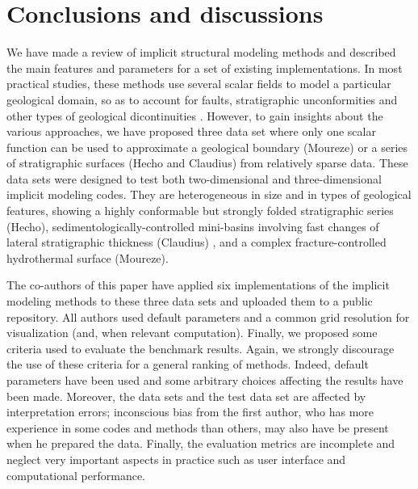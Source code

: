 \documentclass[final]{ring20}
\begin{document}
{%
 


\section*{Conclusions and discussions}
\label{sec:conclu}
We have made a review of implicit structural modeling methods and described the main features and parameters for a set of existing implementations. In most practical studies, these methods use several scalar fields to model a particular geological domain, so as to account for faults, stratigraphic unconformities and other types of geological dicontinuities \citep{Wellmann2018AiG}. However, to gain insights about the various approaches, we have proposed three data set where only one scalar function can be used to approximate a geological boundary (Moureze) or a series of stratigraphic surfaces (Hecho and Claudius) from relatively sparse data. 
These data sets were designed to test both two-dimensional and three-dimensional implicit modeling codes. They are heterogeneous in size and in types of geological features, showing a highly conformable but strongly folded stratigraphic series (Hecho), sedimentologically-controlled mini-basins involving fast changes of lateral stratigraphic thickness (Claudius) , and a complex fracture-controlled hydrothermal surface (Moureze). 

The co-authors of this paper have applied six implementations of the implicit modeling methods to these three data sets and uploaded them to a public repository. All authors used default parameters and a common grid resolution for visualization (and, when relevant computation). Finally, we proposed some criteria used to evaluate the benchmark results. Again, we strongly discourage the use of these criteria for a general ranking of methods. Indeed, default parameters have been used and some arbitrary choices affecting the results have been made. Moreover, the data sets and the test data set are affected by interpretation errors; inconscious bias from the first author, who has more experience in some codes and methods than others, may also have be present when he prepared the data. Finally, the evaluation metrics are incomplete and neglect very important aspects in practice such as user interface and computational performance. 

}
\end{document}
